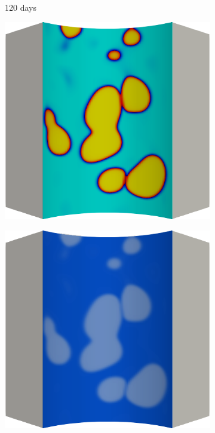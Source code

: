 \begin{figure}[!htbp]
  \begin{subfigure}{0.15\textwidth}
    \centering
    \caption*{120 days}
  \end{subfigure}
  \begin{subfigure}{0.19\textwidth}
    \centering
    \includegraphics[width=\textwidth]{Chapter5/figures/spallation/c.0012}
  \end{subfigure}
  \hspace{0.06\textwidth}
  \begin{subfigure}{0.19\textwidth}
    \centering
    \includegraphics[width=\textwidth]{Chapter5/figures/spallation/d.0012}

\end{subfigure}
\end{figure}
